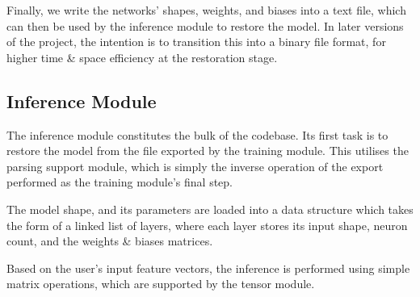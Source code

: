 \documentclass[12pt]{article}
\begin{document}
Finally, we write the networks' shapes, weights, and biases into a text file, which can then be used by the inference module to restore the model. In later versions of the project, the intention is to transition this into a binary file format, for higher time \& space efficiency at the restoration stage.

\subsection{Inference Module}
The inference module constitutes the bulk of the codebase. Its first task is to restore the model from the file exported by the training module. This utilises the parsing support module, which is simply the inverse operation of the export performed as the training module's final step.\bigskip

The model shape, and its parameters are loaded into a data structure which takes the form of a linked list of layers, where each layer stores its input shape, neuron count, and the weights \& biases matrices.\bigskip

Based on the user's input feature vectors, the inference is performed using simple matrix operations, which are supported by the tensor module.
\end{document}
